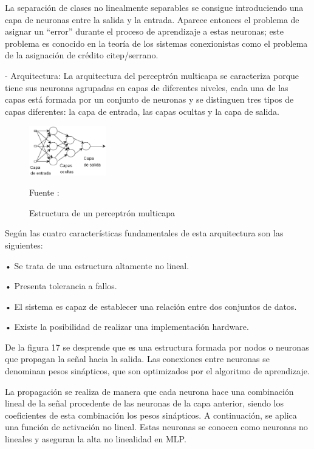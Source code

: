\documentclass[a4paper, 12pt]{article}
\begin{document}
\begin{enumerate}
La separación de clases no linealmente separables se consigue introduciendo una capa de neuronas entre la salida y la entrada. Aparece entonces el problema de asignar un “error” durante el proceso de aprendizaje a estas neuronas; este problema es conocido en la teoría de los sistemas conexionistas como el problema de la asignación de crédito citep/{serrano}. \par 

- Arquitectura:
\vskip 0.3cm
La arquitectura del perceptrón multicapa se caracteriza porque tiene sus neuronas agrupadas en capas de diferentes niveles, cada una de las capas está formada por un conjunto de neuronas y se distinguen tres tipos de capas diferentes: la capa de entrada, las capas ocultas y la capa de salida. \citep{Isasi}
\begin{figure}[ht]
\begin{center}
\includegraphics[width=0.3\textwidth]{perceptron_multicapa}
\end{center}
\begin{center}
\caption{\small{Estructura de un perceptrón multicapa}}
{\small{Fuente : \cite{serrano}}}
\end{center}
\end{figure}
\vskip 0.3cm
Según \cite{serrano} las cuatro características fundamentales de esta arquitectura son las siguientes:\par
•	Se trata de una estructura altamente no lineal.\par
•	Presenta tolerancia a fallos.\par
•	El sistema es capaz de establecer una relación entre dos conjuntos de datos.\par
•	Existe la posibilidad de realizar una implementación hardware.\par
De la figura 17 se desprende que es una estructura formada por nodos o neuronas que propagan la señal hacia la salida. Las conexiones entre neuronas se denominan pesos sinápticos, que son optimizados por el algoritmo de aprendizaje.\par
La propagación se realiza de manera que cada neurona hace una combinación lineal de la señal procedente de las neuronas de la capa anterior, siendo los coeficientes de esta combinación los pesos sinápticos. A continuación, se aplica una función de activación no lineal. Estas neuronas se conocen como neuronas no lineales y aseguran la alta no linealidad en MLP.\par



\end{enumerate}
\end{document}
